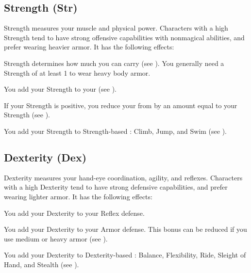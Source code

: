     \subsection{Strength (Str)}\label{Strength}
        {
            Strength measures your muscle and physical power.
            Characters with a high Strength tend to have strong offensive capabilities with nonmagical abilities, and prefer wearing heavier armor.
            It has the following effects:
            \begin{raggeditemize}
                \item Strength determines how much you can carry (see ).
                    You generally need a Strength of at least 1 to wear heavy body armor.
                \item You add your Strength to your  (see ).
                \item If your Strength is positive, you reduce your  from  by an amount equal to your Strength (see ).
                \item You add your Strength to Strength-based : Climb, Jump, and Swim (see ).
            \end{raggeditemize}
        }

    \subsection{Dexterity (Dex)}\label{Dexterity}
        {
            Dexterity measures your hand-eye coordination, agility, and reflexes.
            Characters with a high Dexterity tend to have strong defensive capabilities, and prefer wearing lighter armor.
            It has the following effects:
            \begin{raggeditemize}
                \item You add your Dexterity to your Reflex defense.
                \item You add your Dexterity to your Armor defense.
                    This bonus can be reduced if you use medium or heavy armor (see ).
                \item You add your Dexterity to Dexterity-based : Balance, Flexibility, Ride, Sleight of Hand, and Stealth (see ).
            \end{raggeditemize}
        }

